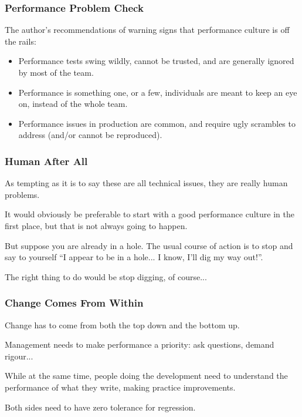 \begin{frame}
\frametitle{Performance Problem Check}

The author's recommendations of warning signs that performance culture is off the rails:

\begin{itemize}

\item Performance tests swing wildly, cannot be trusted, and are generally ignored by most of the team.
\item Performance is something one, or a few, individuals are meant to keep an eye on, instead of the whole team.
\item Performance issues in production are common, and require ugly scrambles to address (and/or cannot be reproduced).
\end{itemize}

\end{frame}



\begin{frame}
\frametitle{Human After All}


As tempting as it is to say these are all technical issues, they are really human problems. 

It would obviously be preferable to start with a good performance culture in the first place, but that is not always going to happen. 

But suppose you are already in a hole. The usual course of action is to stop and say to yourself ``I appear to be in a hole... I know, I'll dig my way out!''. 

The right thing to do would be stop digging, of course...
\end{frame}



\begin{frame}
\frametitle{Change Comes From Within}

Change has to come from both the top down and the bottom up. 

Management needs to make performance a priority: ask questions, demand rigour... 

While at the same time, people doing the development need to understand the performance of what they write, making practice improvements. 

Both sides need to have zero tolerance for regression.

\end{frame}



